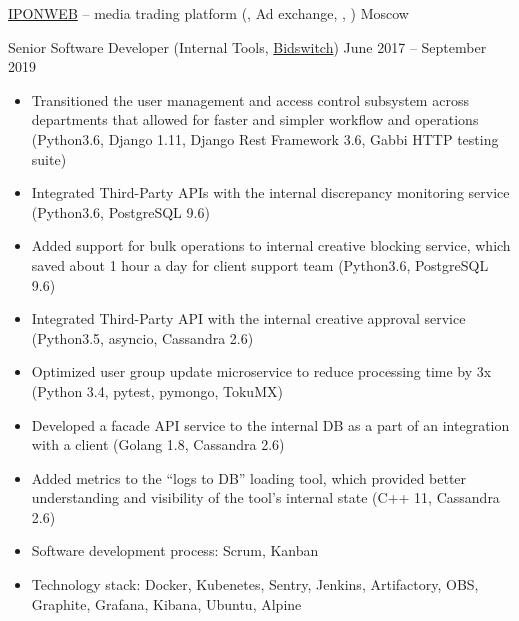 \documentclass[unicode, 10pt, a4paper, oneside, fleqn]{article}
\begin{document}
\job  %
    {\href{http://www.iponweb.com}{IPONWEB} -- media trading platform
     (, Ad exchange, , )}
    {Moscow}
    {
        \position  %
        {Senior Software Developer (Internal Tools, \href{http://www.bidswitch.com/}{Bidswitch})}
        {June 2017 -- September 2019}
        {
            \begin{itemize}
                \item{Transitioned the user management and access control subsystem
                      across departments that allowed for faster and simpler
                      workflow and operations (Python3.6, Django 1.11,
                      Django Rest Framework 3.6, Gabbi HTTP testing suite)}
                \item{Integrated Third-Party APIs with the internal
                      discrepancy monitoring service (Python3.6, PostgreSQL 9.6)}
                \item{Added support for bulk operations to internal creative
                      blocking service, which saved about 1 hour a day for client
                      support team (Python3.6, PostgreSQL 9.6)}
                \item{Integrated Third-Party API with the internal creative
                      approval service (Python3.5, asyncio, Cassandra 2.6)}
                \item{Optimized user group update microservice to reduce
                      processing time by 3x (Python 3.4, pytest, pymongo, TokuMX)}
                \item{Developed a facade API service to the internal DB as a part of
                      an integration with a client (Golang 1.8, Cassandra 2.6)}
                \item{Added metrics to the ``logs to DB'' loading tool, which provided
                      better understanding and visibility of the tool's internal state
                      (C++ 11, Cassandra 2.6)}
                \item{Software development process: Scrum, Kanban}
                \item{Technology stack: Docker, Kubenetes, Sentry, Jenkins,
                      Artifactory, OBS, Graphite, Grafana, Kibana, Ubuntu, Alpine}
            \end{itemize}
        }
        \position  %
}
\end{document}
